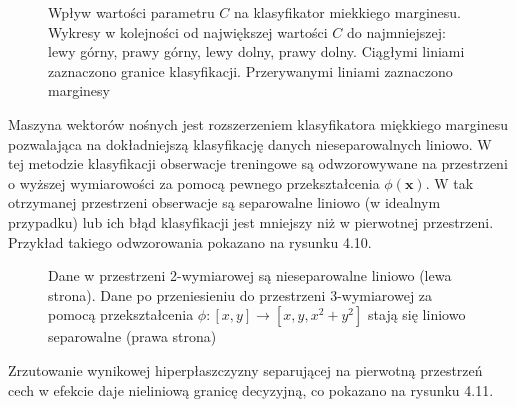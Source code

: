 \documentclass[notitlepage]{report}
\begin{document}
\begin{figure}[H]
	\centering
	\caption{Wpływ wartości parametru $C$ na klasyfikator miekkiego marginesu. Wykresy w kolejności od największej wartości $C$ do najmniejszej: lewy górny, prawy górny, lewy dolny, prawy dolny. Ciągłymi liniami zaznaczono granice klasyfikacji. Przerywanymi liniami zaznaczono marginesy \cite{islr}}
\end{figure}
Maszyna wektorów nośnych jest rozszerzeniem klasyfikatora miękkiego marginesu pozwalająca na dokładniejszą klasyfikację danych nieseparowalnych liniowo. W tej metodzie klasyfikacji obserwacje treningowe są odwzorowywane na przestrzeni o wyższej wymiarowości za pomocą pewnego przekształcenia $\phi(\mathbf{x})$. W tak otrzymanej przestrzeni obserwacje są separowalne liniowo (w idealnym przypadku) lub ich błąd klasyfikacji jest mniejszy niż w pierwotnej przestrzeni. Przykład takiego odwzorowania pokazano na rysunku 4.10.
\begin{figure}[H]
	\centering
	\caption{Dane w przestrzeni 2-wymiarowej są nieseparowalne liniowo (lewa strona). Dane po przeniesieniu do przestrzeni 3-wymiarowej za pomocą przekształcenia $\phi: [x,y] \rightarrow [x,y,x^2+y^2]$ stają się liniowo separowalne (prawa strona) \cite{svmimg}}
\end{figure}
\noindent Zrzutowanie wynikowej hiperpłaszczyzny separującej na pierwotną przestrzeń cech w efekcie daje nieliniową granicę decyzyjną, co pokazano na rysunku 4.11.
\end{document}
